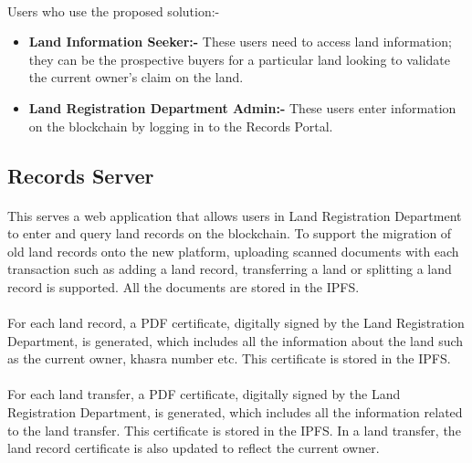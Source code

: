 \documentclass{article}
\begin{document}
    \paragraph{}
    Users who use the proposed solution:-
    \begin{itemize}
        \item \textbf{Land Information Seeker:-} These users need to access land information; they can be the prospective buyers for a particular land looking to validate the current owner's claim on the land.
        \item \textbf{Land Registration Department Admin:-} These users enter information on the blockchain by logging in to the Records Portal.
    \end{itemize}

    \subsection{Records Server}
        \paragraph{}
        This serves a web application that allows users in Land Registration Department to enter and query land records on the blockchain. To support the migration of old land records onto the new platform, uploading scanned documents with each transaction such as adding a land record, transferring a land or splitting a land record is supported. All the documents are stored in the IPFS.

        \paragraph{}
        For each land record, a PDF certificate, digitally signed by the Land Registration Department, is generated, which includes all the information about the land such as the current owner, khasra number etc. This certificate is stored in the IPFS.
        
        \paragraph{}
        For each land transfer, a PDF certificate, digitally signed by the Land Registration Department, is generated, which includes all the information related to the land transfer. This certificate is stored in the IPFS. In a land transfer, the land record certificate is also updated to reflect the current owner.
\end{document}
